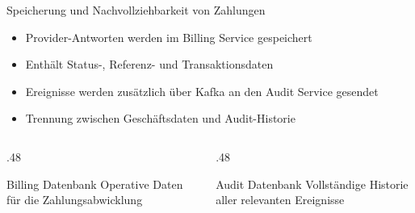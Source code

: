 \documentclass[aspectratio=169,11pt]{beamer}
\begin{document}
\begin{frame}{Speicherung und Nachvollziehbarkeit von Zahlungen}
\begin{itemize}
    \item Provider-Antworten werden im Billing Service gespeichert
    \item Enthält Status-, Referenz- und Transaktionsdaten
    \item Ereignisse werden zusätzlich über Kafka an den Audit Service gesendet
    \item Trennung zwischen Geschäftsdaten und Audit-Historie
\end{itemize}

\vspace{.3cm}

\begin{columns}[T]
    \begin{column}{.48\textwidth}
        \begin{block}{Billing Datenbank}
            Operative Daten für die Zahlungsabwicklung
        \end{block}
    \end{column}
    \begin{column}{.48\textwidth}
        \begin{block}{Audit Datenbank}
            Vollständige Historie aller relevanten Ereignisse
        \end{block}
    \end{column}
\end{columns}
\end{frame}
\end{document}
